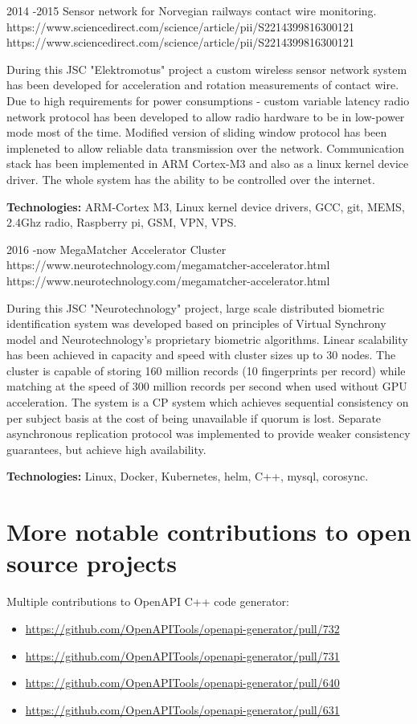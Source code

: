 \documentclass[12]{article}
\begin{document}
\job
{2014 -}{2015}
{Sensor network for Norvegian railways contact wire monitoring.}
{https://www.sciencedirect.com/science/article/pii/S2214399816300121}
{https://www.sciencedirect.com/science/article/pii/S2214399816300121}
{
During this JSC "Elektromotus" project a custom wireless sensor network system has been developed for acceleration and rotation measurements of contact wire.
Due to high requirements for power consumptions - custom variable latency radio network protocol has been developed to allow radio hardware to be in low-power mode most of the time.
Modified version of sliding window protocol has been impleneted to allow reliable data transmission over the network.
Communication stack has been implemented in ARM Cortex-M3 and also as a linux kernel device driver.
The whole system has the ability to be controlled over the internet.\\
\rule{0mm}{5mm}\textbf{Technologies:} ARM-Cortex M3, Linux kernel device drivers, GCC, git, MEMS, 2.4Ghz radio, Raspberry pi, GSM, VPN, VPS.}

\job
{2016 -}{now}
{MegaMatcher Accelerator Cluster}
{https://www.neurotechnology.com/megamatcher-accelerator.html}
{https://www.neurotechnology.com/megamatcher-accelerator.html}
{
During this JSC "Neurotechnology" project, large scale distributed biometric identification system was developed based on principles of Virtual Synchrony model and Neurotechnology's proprietary biometric algorithms.
Linear scalability has been achieved in capacity and speed with cluster sizes up to 30 nodes.
The cluster is capable of storing 160 million records (10 fingerprints per record) while matching at the speed of 300 million records per second when used without GPU acceleration.
The system is a CP system which achieves sequential consistency on per subject basis at the cost of being unavailable if quorum is lost.
Separate asynchronous replication protocol was implemented to provide weaker consistency guarantees, but achieve high availability.\\
\rule{0mm}{5mm}\textbf{Technologies:} Linux, Docker, Kubernetes, helm, C++, mysql, corosync.}

\section{More notable contributions to open source projects}

{
Multiple contributions to OpenAPI C++ code generator:
\begin{itemize}
	\item \url{https://github.com/OpenAPITools/openapi-generator/pull/732}
	\item \url{https://github.com/OpenAPITools/openapi-generator/pull/731}
	\item \url{https://github.com/OpenAPITools/openapi-generator/pull/640}
	\item \url{https://github.com/OpenAPITools/openapi-generator/pull/631}
\end{itemize}
}
\end{document}
